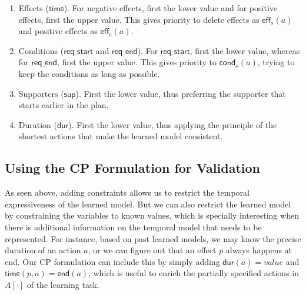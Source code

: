\documentclass[runningheads]{llncs}
\newcommand{\eff}{\mathsf{eff}}    %
\newcommand{\cond}{\mathsf{cond}}  %
\newcommand{\dur}{\mathsf{dur}}    %
\newcommand{\en}{\mathsf{end}}     %
\newcommand{\supp}{\mathsf{sup}}   %
\newcommand{\tim}{\mathsf{time}}   %
\newcommand{\reqs}{\mathsf{req\_{start}}} %
\newcommand{\reqe}{\mathsf{req\_{end}}}   %
\begin{document}


\begin{enumerate}
  \item Effects ($\tim$). For negative effects, first the lower value and for positive effects, first the upper value. This gives priority to delete effects as $\eff_s(a)$ and positive effects as $\eff_e(a)$.
  \item Conditions ($\reqs$ and $\reqe$). For $\reqs$, first the lower value, whereas for $\reqe$, first the upper value. This gives priority to $\cond_o(a)$, trying to keep the conditions as long as possible.
  \item Supporters ($\supp$). First the lower value, thus preferring the supporter that starts earlier in the plan.
  \item Duration ($\dur$). First the lower value, thus applying the principle of the shortest actions that make the learned model consistent.
\end{enumerate}




\subsection{Using the CP Formulation for Validation}
\label{sec:usingCPValidation}

As seen above, adding constraints allows us to restrict the temporal expressiveness of the learned model.
But we can also restrict the learned model by constraining the variables to known values, which is specially interesting when there is additional information on the temporal model that needs to be represented. For instance, based on past learned models, we may know the precise duration of an action $a$,
or we can figure out that an effect $p$ always happens at end.
Our CP formulation can include this by simply adding $\dur(a)=value$ and $\tim(p,a)=\en(a)$, which is useful to enrich the partially specified actions in $A[\cdot]$ of the learning task.
\end{document}
